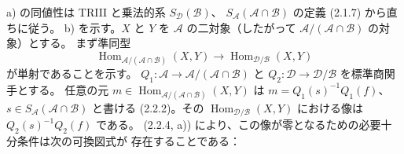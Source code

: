 a) の同値性は TRIII と乗法的系 $S_{\mathcal D}(\mathcal B)$、
$S_{\mathcal A}(\mathcal A\cap\mathcal B)$ の定義 (2.1.7) から直ちに従う。
b) を示す。$X$ と $Y$ を $\mathcal A$ の二対象（したがって
$\mathcal A/(\mathcal A\cap\mathcal B)$ の対象）とする。
まず準同型
\[
 \operatorname{Hom}_{\mathcal A/(\mathcal A\cap\mathcal B)}(X,Y)
 \longrightarrow\operatorname{Hom}_{\mathcal D/\mathcal B}(X,Y)
\]
が単射であることを示す。
$Q_1\colon\mathcal A\longrightarrow\mathcal A/(\mathcal A\cap\mathcal B)$ と
$Q_2\colon\mathcal D\longrightarrow\mathcal D/\mathcal B$ を標準商関手とする。
任意の元 $m\in\operatorname{Hom}_{\mathcal A/(\mathcal A\cap\mathcal B)}(X,Y)$
は $m=Q_1(s)^{-1}Q_1(f)$、
$s\in S_{\mathcal A}(\mathcal A\cap\mathcal B)$ と書ける (2.2.2)。その
$\operatorname{Hom}_{\mathcal D/\mathcal B}(X,Y)$ における像は
$Q_2(s)^{-1}Q_2(f)$ である。
(2.2.4, a)) により、この像が零となるための必要十分条件は次の可換図式が
存在することである：
\begin{center}
\end{center}
\endgroup

